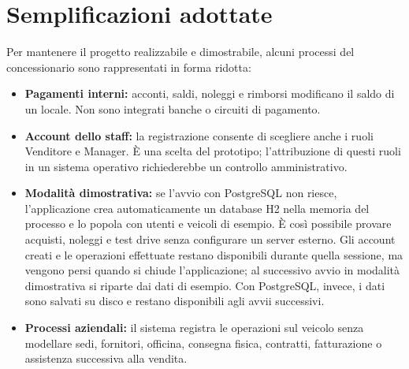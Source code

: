 \section{Semplificazioni adottate}\label{sec:semplificazioni}
Per mantenere il progetto realizzabile e dimostrabile, alcuni processi del concessionario sono rappresentati in forma ridotta:
\begin{itemize}
  \item \textbf{Pagamenti interni:} acconti, saldi, noleggi e rimborsi modificano il saldo di un  locale. Non sono integrati banche o circuiti di pagamento.
  \item \textbf{Account dello staff:} la registrazione consente di scegliere anche i ruoli Venditore e Manager. È una scelta del prototipo; l'attribuzione di questi ruoli in un sistema operativo richiederebbe un controllo amministrativo.
  \item \textbf{Modalità dimostrativa:} se l'avvio con PostgreSQL non riesce, l'applicazione crea automaticamente un database H2 nella memoria del processo e lo popola con utenti e veicoli di esempio. È così possibile provare acquisti, noleggi e test drive senza configurare un server esterno. Gli account creati e le operazioni effettuate restano disponibili durante quella sessione, ma vengono persi quando si chiude l'applicazione; al successivo avvio in modalità dimostrativa si riparte dai dati di esempio. Con PostgreSQL, invece, i dati sono salvati su disco e restano disponibili agli avvii successivi.
  \item \textbf{Processi aziendali:} il sistema registra le operazioni sul veicolo senza modellare sedi, fornitori, officina, consegna fisica, contratti, fatturazione o assistenza successiva alla vendita.
\end{itemize}
